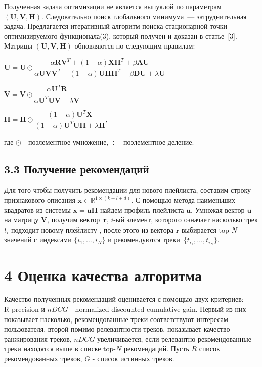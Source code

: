 \documentclass[12pt,twoside]{article}
\begin{document}
Полученная задача оптимизации не является выпуклой по параметрам $(\mathbf{U, V, H})$. Следовательно поиск глобального минимума~--- затруднительная задача. Предлагается итеративный алгоритм поиска стационарной точки оптимизируемого функционала(3), который получен и доказан в статье~[3]. Матрицы $(\mathbf{U, V, H})$ обновляются по следующим правилам:

$\mathbf{U} = \mathbf{U} \odot \dfrac{\alpha\mathbf{R}\mathbf{V}^T + (1 -\alpha)\mathbf{X}\mathbf{H}^T + \beta\mathbf{AU}}{\alpha\mathbf{UV}\mathbf{V}^T + (1 - \alpha)\mathbf{UH}\mathbf{H}^T + \beta\mathbf{DU} + \lambda\mathbf{U}}$

$\mathbf{V} = \mathbf{V} \odot \dfrac{\alpha\mathbf{U}^T\mathbf{R}}{\alpha\mathbf{U}^T\mathbf{UV} + \lambda\mathbf{V}}$

$\mathbf{H} = \mathbf{H} \odot \dfrac{(1 - \alpha)\mathbf{U}^T\mathbf{X}}{(1 - \alpha)\mathbf{U}^T\mathbf{UH} + \lambda\mathbf{H}}$,

где $\odot$ - поэлементное умножение, $\div$ - поэлементное деление. 

\subsection{3.3 Получение рекомендаций}

Для того чтобы получить рекомендации для нового плейлиста, составим строку признакового описания $\mathbf{x} \in \mathbb{R}^{1 \times  (k + l + d)}$.  С помощью метода наименьших квадратов из системы $\mathbf{x} = \mathbf{u}\mathbf{H}$ найдем профиль плейлиста $\mathbf{u}$. Умножая вектор $\mathbf{u}$ на матрицу $\mathbf{V}$, получим вектор~$\mathbf{r}$, $i$-ый элемент, которого означает насколько трек $t_i$ подходит новому плейлисту , после этого из вектора $\mathbf{r}$ выбирается top-$N$ значений с индексами $\{i_1, \ldots, i_N\}$ и рекомендуются треки~$\{t_{i_1}, \ldots, t_{i_N}\}$.

\section{4 Оценка качества алгоритма}

Качество полученных рекомендаций оценивается с помощью двух критериев: \\R-precision и $nDCG$ - normalized discounted cumulative gain. Первый из них показывает насколько, рекомендованные треки соответствуют интересам пользователя, второй помимо релевантности треков, показывает качество ранжирования треков, $nDCG$ увеличивается, если релевантно рекомендованные треки находятся выше в списке top-$N$ рекомендаций. Пусть $R$ список рекомендованных треков, $G$ - список истинных треков.
\end{document}
